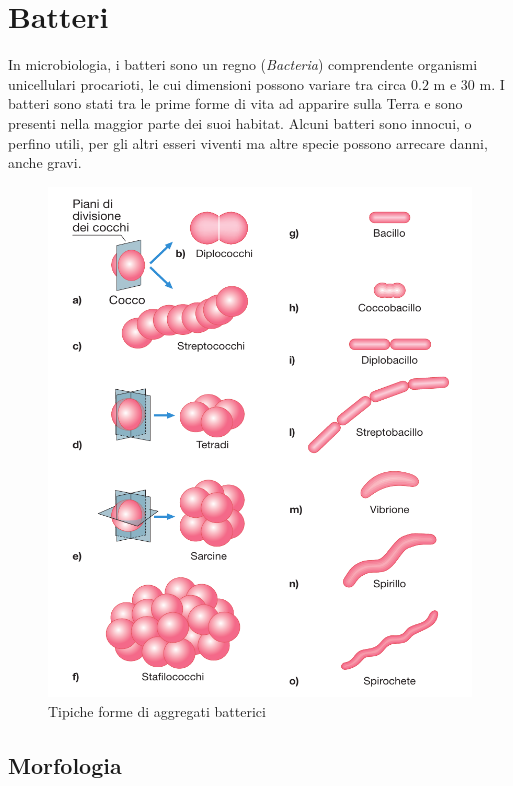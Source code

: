 \documentclass[../main.tex]{subfiles}
\begin{document}
\section{Batteri}

In \Gls{microbiologia}, i batteri sono un regno (\textit{Bacteria}) comprendente organismi unicellulari procarioti, le cui dimensioni possono variare tra circa $0.2$ \micro m e $30$ \micro m.\cite{goker_2024} I batteri sono stati tra le prime forme di vita ad apparire sulla Terra e sono presenti nella maggior parte dei suoi habitat. Alcuni batteri sono innocui, o perfino utili\cite{mccutcheon_2021}, per gli altri esseri viventi ma altre specie possono arrecare danni, anche gravi.\cite{johnson_2018}
\medskip

\begin{figure}[h]
	\centering
	\includegraphics[keepaspectratio, width=0.95\linewidth]{images/batteri_morfologia.png}
	\caption[Tipiche forme di aggregati batterici]{
		Tipiche forme di aggregati batterici \cite{deho_galli_2020}}
	\label{fig:bacteria_morphology}
\end{figure}

\subsection{Morfologia}
\end{document}

